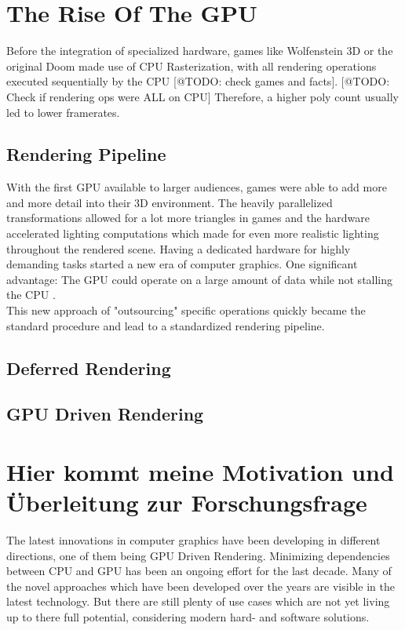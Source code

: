 \section{The Rise Of The GPU}

Before the integration of specialized hardware, games like Wolfenstein 3D or the original Doom made use of 
\ac{CPU} Rasterization, with all rendering operations executed sequentially by the \ac{CPU} [@TODO: check games and facts].
[@TODO: Check if rendering ops were ALL on CPU]
Therefore, a higher poly count usually led to lower framerates.

\subsection{Rendering Pipeline}

With the first \ac{GPU} available to larger audiences, games were able to add more and more 
detail into their 3D environment. The heavily parallelized transformations allowed for a lot 
more triangles in games and the hardware accelerated lighting computations which made for 
even more realistic lighting throughout the rendered scene. Having a dedicated hardware for 
highly demanding tasks started a new era of computer graphics. One significant advantage: 
The \ac{GPU} could operate on a large amount of data while not stalling the \ac{CPU} \cite{Fenno2024}.\\

\noindent 
This new approach of "outsourcing" specific operations quickly became the standard procedure and 
lead to a standardized rendering pipeline. 



\subsection{Deferred Rendering}



\subsection{GPU Driven Rendering}


\section{Hier kommt meine Motivation und Überleitung zur Forschungsfrage}

The latest innovations in computer graphics have been developing in different directions,
one of them being \ac{GPU} Driven Rendering. Minimizing dependencies between \ac{CPU} and \ac{GPU} 
has been an ongoing effort for the last decade. Many of the novel approaches which have been developed 
over the years are visible in the latest technology. But there are still plenty of use cases 
which are not yet living up to there full potential, considering modern hard- and software solutions.\\

